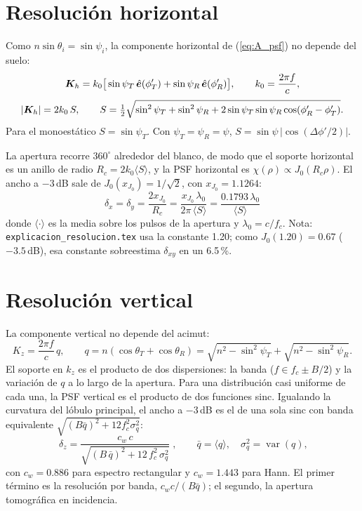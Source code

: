 \section{Resolución horizontal}

Como $n\sin\theta_i=\sin\psi_i$, la componente horizontal de (\ref{eq:A_psf}) no depende
del suelo:
\begin{equation}
  \bm{K}_h=k_0\big[\sin\psi_T\,\hat{\bm{e}}(\phi'_T)+\sin\psi_R\,\hat{\bm{e}}(\phi'_R)\big],
  \qquad k_0=\frac{2\pi f}{c},
\end{equation}
\begin{equation}
  |\bm{K}_h|=2k_0\,S,\qquad
  S=\tfrac12\sqrt{\sin^2\psi_T+\sin^2\psi_R+2\sin\psi_T\sin\psi_R\cos(\phi'_R-\phi'_T)} .
  \label{eq:A_S}
\end{equation}
Para el monoestático $S=\sin\psi_T$. Con $\psi_T=\psi_R=\psi$, $S=\sin\psi\,|\cos(\Delta\phi'/2)|$.

La apertura recorre $360^{\circ}$ alrededor del blanco, de modo que el soporte horizontal es
un anillo de radio $R_c=2k_0\langle S\rangle$, y la PSF horizontal es
$\chi(\rho)\propto J_0(R_c\rho)$. El ancho a $-3$\,dB sale de $J_0(x_{J_0})=1/\sqrt2$, con
$x_{J_0}=1.1264$:
\begin{equation}
  \boxed{\;\delta_x=\delta_y=\frac{2x_{J_0}}{R_c}=\frac{x_{J_0}\,\lambda_0}{2\pi\,\langle S\rangle}
  =\frac{0.1793\,\lambda_0}{\langle S\rangle}\;}
  \label{eq:A_dxy}
\end{equation}
donde $\langle\cdot\rangle$ es la media sobre los pulsos de la apertura y $\lambda_0=c/f_c$.
Nota: \texttt{explicacion\_resolucion.tex} usa la constante 1.20; como
$J_0(1.20)=0.67$ ($-3.5$\,dB), esa constante sobreestima $\delta_{xy}$ en un 6.5\,\%.

\section{Resolución vertical}

La componente vertical no depende del acimut:
\begin{equation}
  K_z=\frac{2\pi f}{c}\,q,\qquad
  q=n(\cos\theta_T+\cos\theta_R)=\sqrt{n^2-\sin^2\psi_T}+\sqrt{n^2-\sin^2\psi_R}.
  \label{eq:A_q}
\end{equation}
El soporte en $k_z$ es el producto de dos dispersiones: la banda ($f\in f_c\pm B/2$) y la
variación de $q$ a lo largo de la apertura. Para una distribución casi uniforme de cada una,
la PSF vertical es el producto de dos funciones sinc. Igualando la curvatura del lóbulo
principal, el ancho a $-3$\,dB es el de una sola sinc con banda equivalente
$\sqrt{(B\bar q)^2+12f_c^2\sigma_q^2}$:
\begin{equation}
  \boxed{\;\delta_z=\frac{c_w\,c}{\sqrt{(B\,\bar q)^2+12\,f_c^2\,\sigma_q^2}}\;},\qquad
  \bar q=\langle q\rangle,\quad \sigma_q^2=\operatorname{var}(q),
  \label{eq:A_dz}
\end{equation}
con $c_w=0.886$ para espectro rectangular y $c_w=1.443$ para Hann. El primer término es la
resolución por banda, $c_w c/(B\bar q)$; el segundo, la apertura tomográfica en incidencia.


